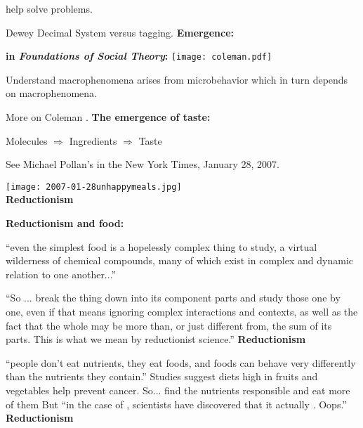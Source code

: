        help solve problems.
    
      Dewey Decimal System versus tagging.
  \textbf{Emergence:}

  \textbf{
      \smallskip
      in \textit{Foundations of Social Theory}:}
    \texttt{[image: coleman.pdf]}
  \bigskip
  
   
    Understand macrophenomena arises from microbehavior
    which in turn depends on macrophenomena.\cite{coleman1994a}
  
    More on Coleman 
    .
  \textbf{The emergence of taste:}
    
     
      Molecules $\Rightarrow$ Ingredients $\Rightarrow$ Taste 
     
      See Michael Pollan's
       in the New York Times, January 28, 2007.

      \medskip

      \texttt{[image: 2007-01-28unhappymeals.jpg]}\\
      {\tiny {}}
  \textbf{Reductionism}

  \textbf{Reductionism and food:}
    
%     
     
      ``even the simplest food is a
      hopelessly complex thing to study, a virtual wilderness of chemical
      compounds, many of which exist in complex and dynamic relation to one
      another...''
    
      ``So ... break the
      thing down into its component parts and study those one by one, even
      if that means ignoring complex interactions and contexts, as well as
      the fact that the whole may be more than, or just different from, the
      sum of its parts. This is what we mean by reductionist science.''
  \textbf{Reductionism}
  
   ``people don't eat nutrients, they eat foods, and foods can behave
    very differently than the nutrients they contain.''
   Studies suggest diets high in fruits and vegetables help prevent cancer.
   So...  find the nutrients responsible and eat more of them
   But ``in the case of , scientists have discovered that it
    actually . Oops.''
  \textbf{Reductionism}
    
